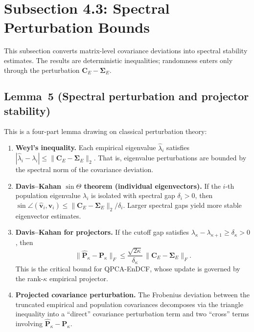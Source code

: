 \documentclass[11pt]{article}
\begin{document}
\section*{Subsection 4.3: Spectral Perturbation Bounds}

This subsection converts matrix-level covariance deviations into spectral
stability estimates. The results are deterministic inequalities; randomness
enters only through the perturbation $\mathbf{C}_E - \boldsymbol{\Sigma}_E$.

\subsection*{Lemma~5 (Spectral perturbation and projector stability)}

This is a four-part lemma drawing on classical perturbation theory:
\begin{enumerate}[label=(\roman*)]
  \item \textbf{Weyl's inequality.} Each empirical eigenvalue
    $\hat{\lambda}_i$ satisfies
    $|\hat{\lambda}_i - \lambda_i| \le \|\mathbf{C}_E - \boldsymbol{\Sigma}_E\|_2$.
    That is, eigenvalue perturbations are bounded by the spectral norm of the
    covariance deviation.

  \item \textbf{Davis--Kahan $\sin\Theta$ theorem (individual eigenvectors).}
    If the $i$-th population eigenvalue $\lambda_i$ is isolated with spectral
    gap $\delta_i > 0$, then
    $\sin\angle(\hat{\mathbf{v}}_i, \mathbf{v}_i) \le
      \|\mathbf{C}_E - \boldsymbol{\Sigma}_E\|_2 / \delta_i$.
    Larger spectral gaps yield more stable eigenvector estimates.

  \item \textbf{Davis--Kahan for projectors.} If the cutoff gap satisfies
    $\lambda_\kappa - \lambda_{\kappa+1} \ge \delta_\kappa > 0$, then
    \[
      \|\hat{\mathbf{P}}_\kappa - \mathbf{P}_\kappa\|_F
      \le
      \frac{\sqrt{2\kappa}}{\delta_\kappa}\,
      \|\mathbf{C}_E - \boldsymbol{\Sigma}_E\|_F.
    \]
    This is the critical bound for QPCA-EnDCF, whose update is governed by the
    rank-$\kappa$ empirical projector.

  \item \textbf{Projected covariance perturbation.} The Frobenius deviation
    between the truncated empirical and population covariances decomposes via
    the triangle inequality into a ``direct'' covariance perturbation term and
    two ``cross'' terms involving $\hat{\mathbf{P}}_\kappa - \mathbf{P}_\kappa$.
\end{enumerate}
\end{document}
